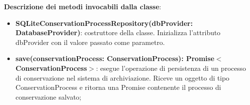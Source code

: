 \documentclass[a4paper,12pt]{article}
\begin{document}
{{{              \noindent \textbf{Descrizione dei metodi invocabili dalla classe}:
                \begin{itemize}
                    \item \textbf{SQLiteConservationProcessRepository(dbProvider: DatabaseProvider)}: costruttore della classe. Inizializza l'attributo dbProvider con il valore passato come parametro.
                    \item \textbf{save(conservationProcess: ConservationProcess): Promise$<$ConservationProcess$>$}: esegue l'operazione di persistenza di un processo di conservazione nel sistema di archiviazione. Riceve un oggetto di tipo ConservationProcess e ritorna una Promise contenente il processo di conservazione salvato;
                \end{itemize}

}}}
\end{document}
